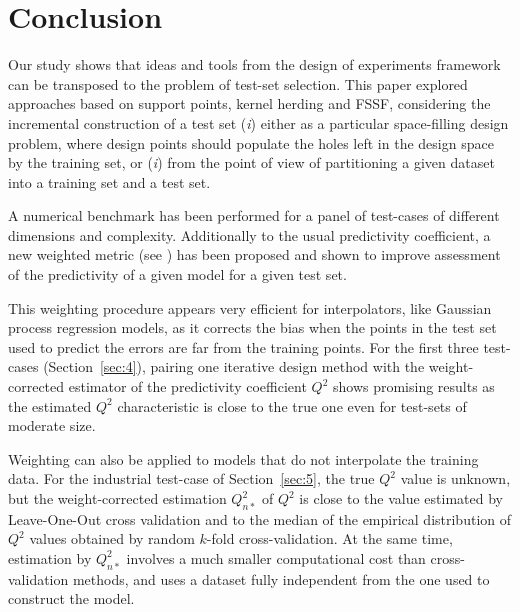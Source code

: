 \section{Conclusion}
Our study shows that ideas and tools from the design of experiments framework can be transposed to the problem of test-set selection. 
This paper explored approaches based on support points, kernel herding and FSSF, considering the incremental construction of a test set (\textit{i}) either as a particular space-filling design problem, where design points should populate the holes left in the design space by the training set, or (\textit{i})  from the point of view of partitioning a given dataset into a training set and a test set. 

A numerical benchmark has been performed for a panel of test-cases of different dimensions and complexity. 
Additionally to the usual predictivity coefficient, a new weighted metric (see \cite{PR2021a}) has been proposed and shown to improve assessment of the predictivity  of a given model for a given test set. 

This weighting procedure appears very efficient for interpolators, like Gaussian process regression models, as it corrects the bias when the points in the test set used to predict the errors are far from the training points. 
For the first three test-cases (Section~\ref{sec:4}), pairing one iterative design method with the weight-corrected estimator of the predictivity coefficient $Q^2$ shows promising results as the estimated $Q^2$ characteristic is close to the true one even for  test-sets of moderate size. 

Weighting can also be applied to models that do not interpolate the training data. 
For the industrial test-case of Section~\ref{sec:5}, the true $Q^2$ value is unknown, but the weight-corrected estimation $Q_{n*}^2$ of $Q^2$ is close to the value estimated by Leave-One-Out cross validation and to the median of the empirical distribution of $Q^2$ values obtained by random $k$-fold cross-validation. 
At the same time, estimation by $Q_{n*}^2$ involves a much smaller computational cost than cross-validation methods, and uses a dataset fully independent from the one used to construct the model.  

